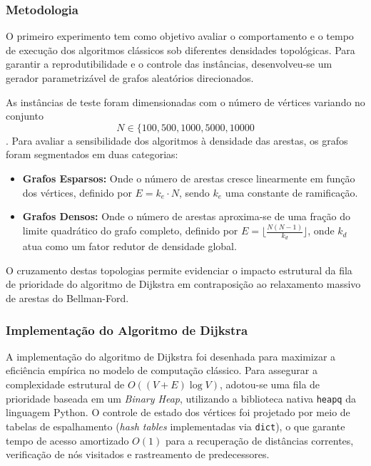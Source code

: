 \documentclass[10pt,a4paper]{article}
\begin{document}
\subsubsection{Metodologia}

O primeiro experimento tem como objetivo avaliar o comportamento e o tempo de execução dos algoritmos clássicos sob diferentes densidades topológicas. Para garantir a reprodutibilidade e o controle das instâncias, desenvolveu-se um gerador parametrizável de grafos aleatórios direcionados.

As instâncias de teste foram dimensionadas com o número de vértices variando no conjunto 
\[
  N \in \{100, 500, 1000, 5000, 10000
\].
Para avaliar a sensibilidade dos algoritmos à densidade das arestas, os grafos foram segmentados em duas categorias:
\begin{itemize}
    \item \textbf{Grafos Esparsos:} Onde o número de arestas cresce linearmente em função dos vértices, definido por $E = k_e \cdot N$, sendo $k_e$ uma constante de ramificação.
    \item \textbf{Grafos Densos:} Onde o número de arestas aproxima-se de uma fração do limite quadrático do grafo completo, definido por $E = \lfloor \frac{N(N-1)}{k_d} \rfloor$, onde $k_d$ atua como um fator redutor de densidade global.
\end{itemize}

O cruzamento destas topologias permite evidenciar o impacto estrutural da fila de prioridade do algoritmo de Dijkstra em contraposição ao relaxamento massivo de arestas do Bellman-Ford.


\subsubsection{Implementação do Algoritmo de Dijkstra}

A implementação do algoritmo de Dijkstra foi desenhada para maximizar a eficiência empírica no modelo de computação clássico. Para assegurar a complexidade estrutural de $O((V + E) \log V)$, adotou-se uma fila de prioridade baseada em um \textit{Binary Heap}, utilizando a biblioteca nativa \texttt{heapq} da linguagem Python. O controle de estado dos vértices foi projetado por meio de tabelas de espalhamento (\textit{hash tables} implementadas via \texttt{dict}), o que garante tempo de acesso amortizado $O(1)$ para a recuperação de distâncias correntes, verificação de nós visitados e rastreamento de predecessores.
\end{document}
